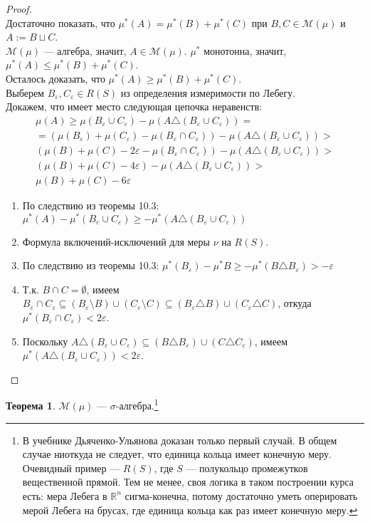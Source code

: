 \documentclass[11pt,a4paper]{report}
\def\eps{\varepsilon}
\def\Real{\mathbb{R}}
\theoremstyle{definition}
\theoremstyle{definition}
\newtheorem{theorem}{Теорема}[section]
\theoremstyle{definition}
\begin{document}
	\begin{proof}$  $\\
		Достаточно показать, что $ \mu^{*}(A) = \mu^{*}(B) + \mu^{*}(C) $ при $ B, C \in \mathcal{M}(\mu) $ и $ A := B \sqcup C $.\\
		$ \mathcal{M}(\mu) $ — алгебра, значит, $ A \in \mathcal{M}(\mu) $. $ \mu^{*} $ монотонна, значит, $ \mu^{*}(A) \le \mu^{*}(B) + \mu^{*}(C) $.\\
		Осталось доказать, что $ \mu^{*}(A) \ge \mu^{*}(B) + \mu^{*}(C) $.\\
		Выберем $ B_{\eps}, C_{\eps} \in R(S) $ из определения измеримости по Лебегу.\\
		Докажем, что имеет место следующая цепочка неравенств:
		\begin{gather}
			\mu(A) \ge \mu(B_{\eps} \cup C_{\eps}) - \mu(A \triangle (B_{\eps} \cup C_{\eps})) =\\
			= (\mu(B_{\eps}) + \mu(C_{\eps}) - \mu(B_{\eps} \cap C_{\eps})) - \mu(A \triangle (B_{\eps} \cup C_{\eps})) >\\
			(\mu(B) + \mu(C) - 2\eps - \mu(B_{\eps} \cap C_{\eps})) - \mu(A \triangle (B_{\eps} \cup C_{\eps})) >\\
			(\mu(B) + \mu(C) - 4\eps) - \mu(A \triangle (B_{\eps} \cup C_{\eps})) >\\
			\mu(B) + \mu(C) - 6\eps
		\end{gather}
		\begin{enumerate}[(1)]
			\item По следствию из теоремы 10.3: $ \mu^{*}(A) - \mu^{*}(B_{\eps} \cup C_{\eps}) \ge -\mu^{*}(A \triangle (B_{\eps} \cup C_{\eps})) $
			\item Формула включений-исключений для меры $ \nu $ на $ R(S) $.
			\item По следствию из теоремы 10.3: $ \mu^{*}(B_{\eps}) - \mu^{*}{B} \ge -\mu^{*}(B \triangle B_{\eps}) > -\eps $
			\item Т.к. $ B \cap C = \emptyset $, имеем $ B_{\eps} \cap C_{\eps} \subseteq (B_{\eps} \setminus B) \cup (C_{\eps} \setminus C) \subseteq (B_{\eps} \triangle B) \cup (C_{\eps} \triangle C) $, откуда $ \mu^{*}(B_{\eps} \cap C_{\eps}) < 2\eps $.
			\item Поскольку $ A \triangle (B_{\eps} \cup C_{\eps}) \subseteq (B \triangle B_{\eps}) \cup (C \triangle C_{\eps}) $, имеем $ \mu^{*}(A \triangle (B_{\eps} \cup C_{\eps})) < 2\eps $.
		\end{enumerate}
	\end{proof}
	\begin{theorem}
		$ \mathcal{M}(\mu) $ — $ \sigma $-алгебра.\footnote{В учебнике Дьяченко-Ульянова доказан только первый случай. В общем случае ниоткуда не следует, что единица кольца имеет конечную меру. Очевидный пример — $ R(S) $, где $ S $ — полукольцо промежутков вещественной прямой. Тем не менее, своя логика в таком построении курса есть: мера Лебега в $ \Real^{n} $ сигма-конечна, потому достаточно уметь оперировать мерой Лебега на брусах, где единица кольца как раз имеет конечную меру. }
	\end{theorem}
\end{document}
